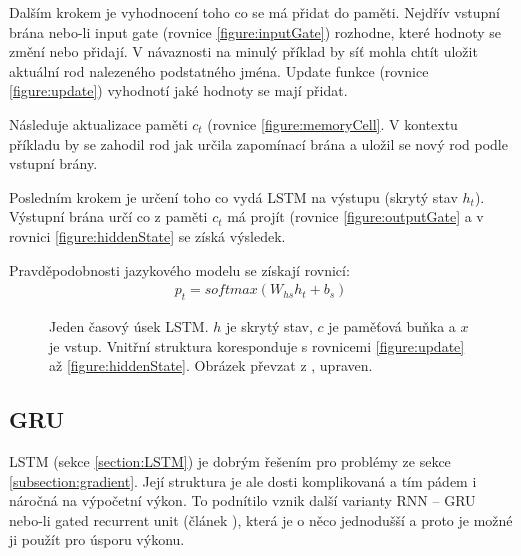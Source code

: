 Dalším krokem je vyhodnocení toho co se má přidat do paměti. Nejdřív vstupní brána nebo-li input gate (rovnice \ref{figure:inputGate}) rozhodne, které hodnoty se změní nebo přidají. V návaznosti na minulý příklad by síť mohla chtít uložit aktuální rod nalezeného podstatného jména. Update funkce (rovnice \ref{figure:update}) vyhodnotí jaké hodnoty se mají přidat.

Následuje aktualizace paměti $c_t$ (rovnice \ref{figure:memoryCell}. V kontextu příkladu by se zahodil rod jak určila zapomínací brána a uložil se nový rod podle vstupní brány.

Posledním krokem je určení toho co vydá LSTM na výstupu (skrytý stav $h_t$). Výstupní brána určí co z paměti $c_t$ má projít (rovnice \ref{figure:outputGate} a v rovnici \ref{figure:hiddenState} se získá výsledek.

Pravděpodobnosti jazykového modelu se získají rovnicí:
\begin{align}
    p_t = softmax(W_{hs}h_{t} + b_{s})
\end{align}


\begin{figure}[h]
    \begin{center}
    \end{center}
	\caption{Jeden časový úsek LSTM. $h$ je skrytý stav, $c$ je paměťová buňka a $x$ je vstup. Vnitřní struktura koresponduje s rovnicemi \ref{figure:update} až \ref{figure:hiddenState}. Obrázek převzat z \cite{understandingLSTM}, upraven.}
	\label{img:LSTM}
\end{figure}



\subsection{GRU}\label{section:GRU}
LSTM (sekce \ref{section:LSTM}) je dobrým řešením pro problémy ze sekce \ref{subsection:gradient}. Její struktura je ale dosti komplikovaná a tím pádem i náročná na výpočetní výkon. To podnítilo vznik další varianty RNN -- GRU nebo-li gated recurrent unit (článek \cite{GRU}), která je o něco jednodušší a proto je možné ji použít pro úsporu výkonu.


